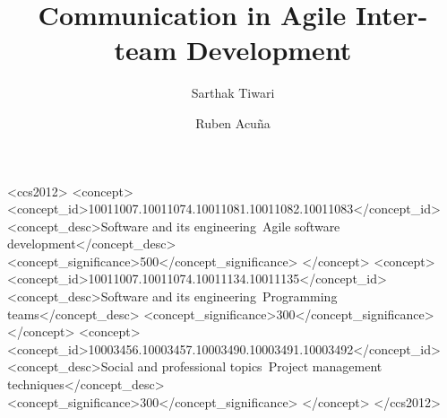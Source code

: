 \documentclass[sigplan,screen]{acmart}
\begin{document}
%
\title{Communication in Agile Inter-team Development}

%


\author{Sarthak Tiwari}

\author{Ruben Acu{\~n}a}



%
\renewcommand{\shortauthors}{Tiwari and Acu{\~n}a}

\renewcommand\footnotetextcopyrightpermission[1]{} %

%
\begin{abstract}



\end{abstract}

%
%
\begin{CCSXML}
<ccs2012>
<concept>
<concept_id>10011007.10011074.10011081.10011082.10011083</concept_id>
<concept_desc>Software and its engineering~Agile software development</concept_desc>
<concept_significance>500</concept_significance>
</concept>
<concept>
<concept_id>10011007.10011074.10011134.10011135</concept_id>
<concept_desc>Software and its engineering~Programming teams</concept_desc>
<concept_significance>300</concept_significance>
</concept>
<concept>
<concept_id>10003456.10003457.10003490.10003491.10003492</concept_id>
<concept_desc>Social and professional topics~Project management techniques</concept_desc>
<concept_significance>300</concept_significance>
</concept>
</ccs2012>
\end{CCSXML}
\end{document}
